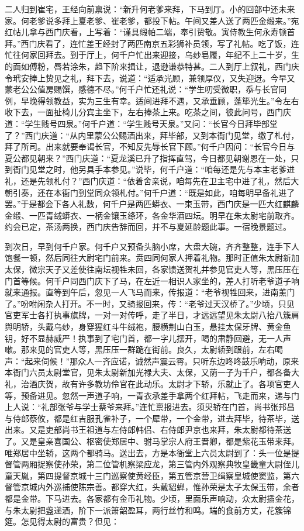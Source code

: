 二人归到崔宅，王经向前禀说：“新升何老爹来拜，下马到厅。小的回部中还未来家。何老爹说多拜上夏老爹、崔老爹，都投下帖。午间又差人送了两匹金缎来。”宛红帖儿拿与西门庆看，上写着：“谨具缎帕二端，奉引贽敬。寅侍教生何永寿顿首拜。”西门庆看了，连忙差王经封了两匹南京五彩狮补员领，写了礼帖。吃了饭，连忙往何家回拜去。到于厅上，何千户忙出来迎接，乌纱皂履，年纪不上二十岁，生的面如傅粉，唇若涂朱，趋下阶来揖让，退逊谦恭特甚。二人到厅上叙礼，西门庆令玳安捧上贽见之礼，拜下去，说道：“适承光顾，兼领厚仪，又失迎迓。今早又蒙老公公值房赐馔，感德不尽。”何千户忙还礼说：“学生叨受微职，忝与长官同例，早晚得领教益，实为三生有幸。适间进拜不遇，又承垂顾，蓬筚光生。”令左右收下去，一面扯椅儿分宾主坐下，左右捧茶上来。吃茶之间，彼此问号，西门庆道：“学生贱号四泉。”何千户道：“学生贱号天泉。”又问：“长官今日拜毕部堂了？”西门庆道：“从内里蒙公公赐酒出来，拜毕部，又到本衙门见堂，缴了札付，拜了所司。出来就要奉谒长官，不知反先辱长官下顾。”何千户因问：“长官今日与夏公都见朝来？”西门庆道：“夏龙溪已升了指挥直驾，今日都见朝谢恩在一处，只到衙门见堂之时，他另具手本参见。”说毕，何千户道：“咱每还是先与本主老爹进礼，还是先领札付？”西门庆道：“依着舍亲说，咱每先在卫主宅中进了礼，然后大朝引奏，还在本衙门到堂同众领札付。”何千户道：“既是如此，咱每明早备礼进了罢。”于是都会下各人礼数，何千户是两匹蟒衣、一束玉带，西门庆是一匹大红麒麟金缎、一匹青绒蟒衣、一柄金镶玉绦环，各金华酒四坛。明早在朱太尉宅前取齐。约会已定，茶汤两换，西门庆告辞而回，并不与夏延龄题此事。一宿晚景题过。

到次日，早到何千户家。何千户又预备头脑小席，大盘大碗，齐齐整整，连手下人饱餐一顿，然后同往大尉宅门前来。贲四同何家人押着礼物。那时正值朱太尉新加太保，微宗天子又差使往南坛视牲未回，各家馈送贺礼并参见官吏人等，黑压压在门首等候。何千户同西门庆下了马，在左近一相识人家坐的，差人打听老爷道子响就来通报。直等到午后，忽见一人飞马而来，传报道：“老爷视牲回来，进南薰门了。”吩咐闲杂人打开。不一时，又骑报回来，传：“老爷过天汉桥了。”少顷，只见官吏军士各打执事旗牌，一对一对传呼，走了半日，才远远望见朱太尉八抬八簇肩舆明轿，头戴乌纱，身穿猩红斗牛绒袍，腰横荆山白玉，悬挂太保牙牌、黄金鱼钥，好不显赫威严！执事到了宅门首，都一字儿摆开，喝的肃静回避，无一人声嗽。那来见的官吏人等，黑压压一群跪在街前。良久，太尉轿到跟前，左右喝声：“起来伺候！”那众人一齐应诺，诚然声震云霄。只听东边咚咚鼓乐响动，原来本衙门六员太尉堂官，见朱太尉新加光禄大夫、太保，又荫一子为千户，都各备大礼，治酒庆贺，故有许多教坊伶官在此动乐。太尉才下轿，乐就止了。各项官吏人等，预备进见。忽然一声道子响，一青衣承差手拿两个红拜帖，飞走而来，递与门上人说：“礼部张爷与学士蔡爷来拜。”连忙禀报进去。须臾轿在门首，尚书张邦昌与侍郎蔡攸，都是红吉服孔雀补子，一个犀带，一个金带，进去拜毕，待茶毕，送出来。又是吏部尚书王祖道与左侍郎韩侣、右侍郎尹京也来拜，朱太尉都待茶送了。又是皇亲喜国公、枢密使郑居中、驸马掌宗人府王晋卿，都是紫花玉带来拜。唯郑居中坐轿，这两个都骑马。送出去，方是本衙堂上六员太尉到了：头一位是提督管两厢捉察使孙荣，第二位管机察梁应龙，第三管内外观察典牧皇畿童大尉侄儿童天胤，第四提督京城十三门巡察使黄经臣，第五管京营卫缉察皇城使窦监，第六督管京城内外巡捕使陈宗善。都穿大红，头戴貂蝉，惟孙荣是太子太保玉带，余者都是金带。下马进去。各家都有金币礼物。少顷，里面乐声响动，众太尉插金花，与朱太尉把盏递酒，阶下一派箫韶盈耳，两行丝竹和鸣。端的食前方丈，花簇锦筵。怎见得太尉的富贵？但见：

